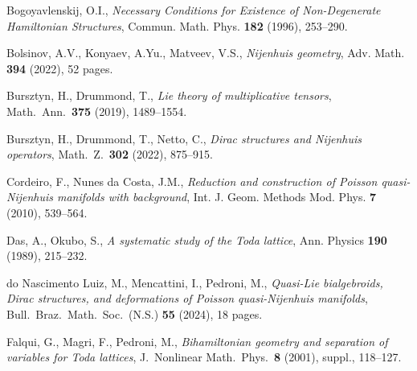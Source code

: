 \documentclass[12pt]{article}
\begin{document}
  Bogoyavlenskij, O.I., {\it Necessary Conditions for Existence of Non-Degenerate Hamiltonian Structures}, 
Commun. Math. Phys. {\bf 182} (1996), 253--290.

{Bolsinov, A.V., Konyaev, A.Yu., Matveev, V.S.}, {\it Nijenhuis geometry}, {Adv. Math.} {\bf 394} (2022), 52 pages.


  Bursztyn, H., Drummond, T.,
{\it Lie theory of multiplicative tensors}, Math.\ Ann.\ {\bf 375} (2019), 1489--1554.

 Bursztyn, H., Drummond, T., Netto, C.,
{\it Dirac structures and Nijenhuis operators}, Math.\ Z.\ {\bf 302} (2022), 875--915. 

 Cordeiro, F., Nunes da Costa, J.M.,
{\it Reduction and construction of Poisson quasi-Nijenhuis manifolds with background}, 
Int. J. Geom. Methods Mod. Phys. {\bf 7} (2010), 539--564.





 Das, A., Okubo, S., {\it A systematic study of the Toda lattice}, Ann. Physics {\bf 190} (1989), 215--232.

 do Nascimento Luiz, M., Mencattini, I., Pedroni, M.,
{\it Quasi-Lie bialgebroids, Dirac structures, and deformations of Poisson quasi-Nijenhuis manifolds\/}, 
Bull.\ Braz.\ Math.\ Soc.\ (N.S.) {\bf 55} (2024), 18 pages.

 Falqui, G., Magri, F., Pedroni, M.,
{\it Bihamiltonian geometry and separation of variables for Toda lattices\/}, J.\ Nonlinear
Math.\ Phys.\ {\bf 8} (2001), suppl., 118--127.
\end{document}
